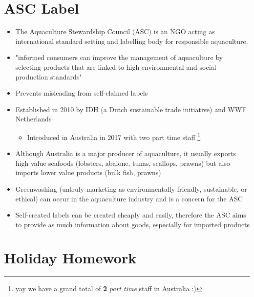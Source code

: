 \section{ASC Label} \label{28/11/2024}
	\begin{itemize}
		\item The Aquaculture Stewardship Council (ASC) is an NGO acting as international standard setting and labelling body for responsible aquaculture.
		\item "informed consumers can improve the management of aquaculture by selecting products that are linked to high environmental and social production standards"
		\item Prevents misleading from self-claimed labels
		\item Established in 2010 by IDH (a Dutch sustainable trade initiative) and WWF Netherlands
			\begin{itemize}
				\item Introduced in Australia in 2017 with two part time staff \footnote{yay we have a grand total of \textbf{2} \textit{part time} staff in Australia :)}
			\end{itemize}
		\item Although Australia is a major producer of aquaculture, it usually exports high value seafoods (lobsters, abalone, tunas, scallops, prawns) but also imports lower value products (bulk fish, prawns)
		\item Greenwashing (untruly marketing as environmentally friendly, sustainable, or ethical) can occur in the aquaculture industry and is a concern for the ASC
		\item Self-created labels can be created cheaply and easily, therefore the ASC aims to provide as much information about goods, especially for imported products
	\end{itemize}

\section{Holiday Homework}
